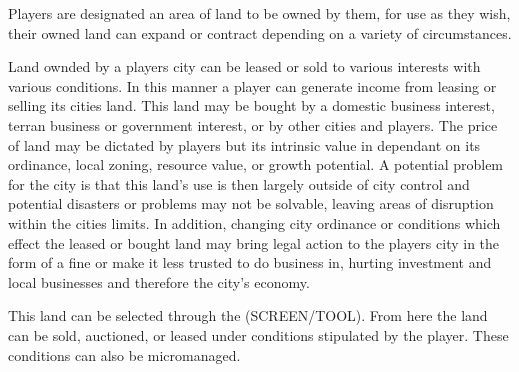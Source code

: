 Players are designated an area of land to be owned by them, for use as they wish, their owned land can expand or contract depending on a variety of circumstances. 

Land ownded by a players city can be leased or sold to various interests with various conditions. In this manner a player can generate income from leasing or selling its cities land. This land may be bought by a domestic business interest, terran business or government interest, or by other cities and players. The price of land may be dictated by players but its intrinsic value in dependant on its ordinance, local zoning, resource value, or growth potential. %
A potential problem for the city is that this land's use is then largely outside of city control and potential disasters or problems may not be solvable, leaving areas of disruption within the cities limits. In addition, changing city ordinance or conditions which effect the leased or bought land may bring legal action to the players city in the form of a fine or make it less trusted to do business in, hurting investment and local businesses and therefore the city's economy.

This land can be selected through the (SCREEN/TOOL). From here the land can be sold, auctioned, or leased under conditions stipulated by the player. These conditions can also be micromanaged.

